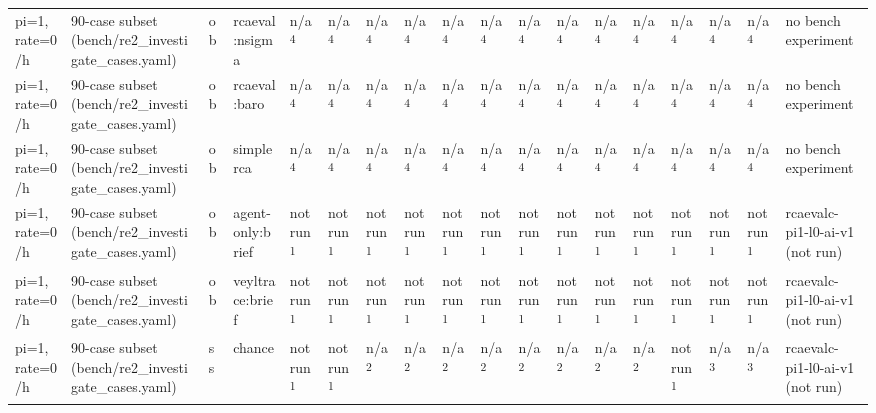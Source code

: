 \begin{table}[t]
\begin{tabular}{llllllllllllllllll}
pi=1, rate=0/h & 90-case subset (bench/re2\_investigate\_cases.yaml) & ob & rcaeval:nsigma & n/a\textsuperscript{4} & n/a\textsuperscript{4} & n/a\textsuperscript{4} & n/a\textsuperscript{4} & n/a\textsuperscript{4} & n/a\textsuperscript{4} & n/a\textsuperscript{4} & n/a\textsuperscript{4} & n/a\textsuperscript{4} & n/a\textsuperscript{4} & n/a\textsuperscript{4} & n/a\textsuperscript{4} & n/a\textsuperscript{4} & no bench experiment \\
pi=1, rate=0/h & 90-case subset (bench/re2\_investigate\_cases.yaml) & ob & rcaeval:baro & n/a\textsuperscript{4} & n/a\textsuperscript{4} & n/a\textsuperscript{4} & n/a\textsuperscript{4} & n/a\textsuperscript{4} & n/a\textsuperscript{4} & n/a\textsuperscript{4} & n/a\textsuperscript{4} & n/a\textsuperscript{4} & n/a\textsuperscript{4} & n/a\textsuperscript{4} & n/a\textsuperscript{4} & n/a\textsuperscript{4} & no bench experiment \\
pi=1, rate=0/h & 90-case subset (bench/re2\_investigate\_cases.yaml) & ob & simplerca & n/a\textsuperscript{4} & n/a\textsuperscript{4} & n/a\textsuperscript{4} & n/a\textsuperscript{4} & n/a\textsuperscript{4} & n/a\textsuperscript{4} & n/a\textsuperscript{4} & n/a\textsuperscript{4} & n/a\textsuperscript{4} & n/a\textsuperscript{4} & n/a\textsuperscript{4} & n/a\textsuperscript{4} & n/a\textsuperscript{4} & no bench experiment \\
pi=1, rate=0/h & 90-case subset (bench/re2\_investigate\_cases.yaml) & ob & agent-only:brief & not run\textsuperscript{1} & not run\textsuperscript{1} & not run\textsuperscript{1} & not run\textsuperscript{1} & not run\textsuperscript{1} & not run\textsuperscript{1} & not run\textsuperscript{1} & not run\textsuperscript{1} & not run\textsuperscript{1} & not run\textsuperscript{1} & not run\textsuperscript{1} & not run\textsuperscript{1} & not run\textsuperscript{1} & rcaevalc-pi1-l0-ai-v1 (not run) \\
pi=1, rate=0/h & 90-case subset (bench/re2\_investigate\_cases.yaml) & ob & veyltrace:brief & not run\textsuperscript{1} & not run\textsuperscript{1} & not run\textsuperscript{1} & not run\textsuperscript{1} & not run\textsuperscript{1} & not run\textsuperscript{1} & not run\textsuperscript{1} & not run\textsuperscript{1} & not run\textsuperscript{1} & not run\textsuperscript{1} & not run\textsuperscript{1} & not run\textsuperscript{1} & not run\textsuperscript{1} & rcaevalc-pi1-l0-ai-v1 (not run) \\
pi=1, rate=0/h & 90-case subset (bench/re2\_investigate\_cases.yaml) & ss & chance & not run\textsuperscript{1} & not run\textsuperscript{1} & n/a\textsuperscript{2} & n/a\textsuperscript{2} & n/a\textsuperscript{2} & n/a\textsuperscript{2} & n/a\textsuperscript{2} & n/a\textsuperscript{2} & n/a\textsuperscript{2} & n/a\textsuperscript{2} & not run\textsuperscript{1} & n/a\textsuperscript{3} & n/a\textsuperscript{3} & rcaevalc-pi1-l0-ai-v1 (not run) \\

\end{tabular}
\end{table}
